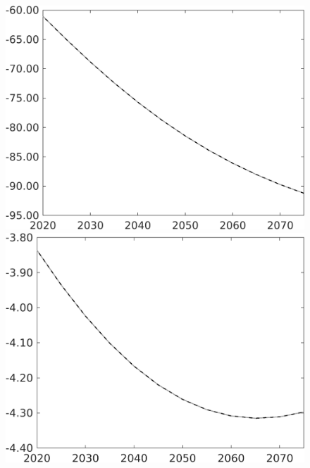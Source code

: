 \documentclass[12pt]{article}
\begin{document}
\begin{figure}[h!!]
\begin{minipage}[]{0.32\textwidth}
	\end{minipage}	
\begin{minipage}[]{0.32\textwidth}
\includegraphics[width=1\textwidth]{../../codding_model/own_basedOnFried/optimalPol_010922_revision/figures/all_13Sept22/PerdifNoTauf_regime0_CompTaul_pgpftf_spillover0_nsk1_xgr1_knspil1_sep1_LFlimit0_emsbase0_countec0_GovRev0_etaa0.79_lgd0.png}
\end{minipage}	
\begin{minipage}[]{0.32\textwidth}
\includegraphics[width=1\textwidth]{../../codding_model/own_basedOnFried/optimalPol_010922_revision/figures/all_13Sept22/PerdifNoTauf_regime0_CompTaul_pn_spillover0_nsk1_xgr1_knspil1_sep1_LFlimit0_emsbase0_countec0_GovRev0_etaa0.79_lgd0.png}

\end{minipage}
\end{figure}
\end{document}
